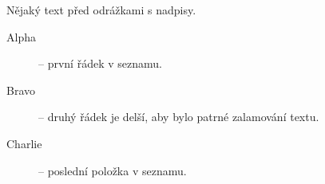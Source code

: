 Nějaký text před odrážkami s nadpisy.
\begin{description}
   \item[Alpha] -- první řádek v seznamu.
   \item[Bravo] -- druhý řádek je delší, aby bylo
     patrné zalamování textu.
   \item[Charlie] -- poslední položka v seznamu.
\end{description}